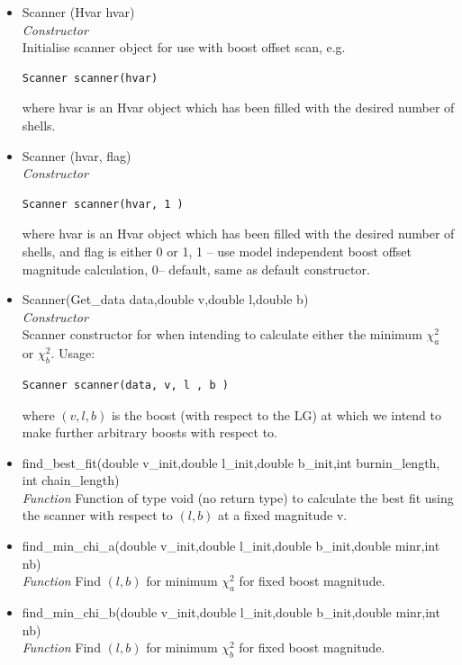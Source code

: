 \documentclass[11pt]{article}
\begin{document}
\begin{itemize}
\item Scanner (Hvar hvar)\\
\textit{Constructor}\\
Initialise scanner object for use with boost offset scan, e.g.
\begin{verbatim}
Scanner scanner(hvar)
\end{verbatim}
where hvar is an Hvar object which has been filled with the desired number of shells.
\item Scanner (hvar, flag) \\
\textit{Constructor}\\
\begin{verbatim}
Scanner scanner(hvar, 1 )
\end{verbatim}
where hvar is an Hvar object which has been filled with the desired number of shells, and flag is either 0 or 1, 1 -- use model independent boost offset magnitude calculation, 0-- default, same as default constructor.

\item Scanner(Get\_data data,double v,double l,double b) \\
\textit{Constructor}\\
Scanner constructor for when intending to calculate either the minimum $\chi^2_a$ or $\chi^2_b$.  Usage:
\begin{verbatim}
Scanner scanner(data, v, l , b )
\end{verbatim}
where $(v,l,b)$ is the boost (with respect to the LG) at which we intend to make further arbitrary boosts with respect to.

\item find\_best\_fit(double v\_init,double l\_init,double b\_init,int burnin\_length, int chain\_length)\\
\textit{Function}
Function of type void (no return type) to calculate the best fit using the scanner with respect to $(l,b)$ at a fixed magnitude v.


\item find\_min\_chi\_a(double v\_init,double l\_init,double b\_init,double minr,int nb)\\
\textit{Function}
Find $(l,b)$ for minimum $\chi^2_a$ for fixed boost magnitude.

\item find\_min\_chi\_b(double v\_init,double l\_init,double b\_init,double minr,int nb)\\
\textit{Function}
Find $(l,b)$ for minimum $\chi^2_b$ for fixed boost magnitude.


\end{itemize}
\end{document}
